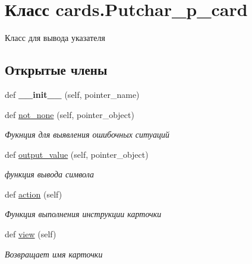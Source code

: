 \hypertarget{classcards_1_1_putchar__p__card}{}\section{Класс cards.\+Putchar\+\_\+p\+\_\+card}
\label{classcards_1_1_putchar__p__card}


Класс для вывода указателя  


\subsection*{Открытые члены}
\begin{DoxyCompactItemize}
\item 
\mbox{\label{classcards_1_1_putchar__p__card_a457eb69d9e36c50cc33c8c342ac97171}} 
def {\bfseries \+\_\+\+\_\+init\+\_\+\+\_\+} (self, pointer\+\_\+name)
\item 
def \mbox{\hyperlink{classcards_1_1_putchar__p__card_a5243088f07d00a7cafabdc2240ca7f23}{not\+\_\+none}} (self, pointer\+\_\+object)
\begin{DoxyCompactList}\small\item\em Фукнция для выявления ошибочных ситуаций \end{DoxyCompactList}\item 
\mbox{\label{classcards_1_1_putchar__p__card_a8335744de904ecff2f37b17dfb3a89d5}} 
def \mbox{\hyperlink{classcards_1_1_putchar__p__card_a8335744de904ecff2f37b17dfb3a89d5}{output\+\_\+value}} (self, pointer\+\_\+object)
\begin{DoxyCompactList}\small\item\em функция вывода символа \end{DoxyCompactList}\item 
def \mbox{\hyperlink{classcards_1_1_putchar__p__card_ac61d82b3ee96f92a953877e3b0b9d692}{action}} (self)
\begin{DoxyCompactList}\small\item\em Функция выполнения инструкции карточки \end{DoxyCompactList}\item 
def \mbox{\hyperlink{classcards_1_1_putchar__p__card_a9dbb824fdf07cf99b6a08cccf4b946ae}{view}} (self)
\begin{DoxyCompactList}\small\item\em Возвращает имя карточки \end{DoxyCompactList}\end{DoxyCompactItemize}
